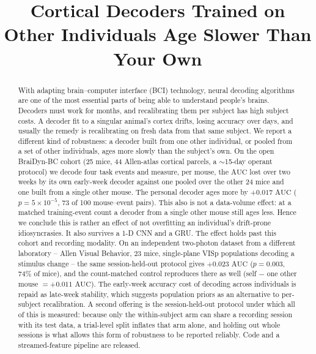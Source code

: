\documentclass[mlmain,onecolumn]{jmlr}
\title[Cortical Decoders Age Slower]{Cortical Decoders Trained on Other
Individuals Age Slower Than Your Own}
\author{\Name{Anonymous Author(s)}}
\newcommand{\auc}{\mathrm{AUC}}
\begin{document}
\maketitle

\begin{abstract}
With adapting brain--computer interface (BCI) technology, neural decoding algorithms are one of the
most essential parts of being able to understand people's brains. Decoders must work for months, and
recalibrating them per subject has high subject costs. A decoder fit to a singular animal's cortex
drifts, losing accuracy over days, and usually the remedy is recalibrating on fresh data from that
same subject. We report a different kind of robustness: a
decoder built from one other individual, or pooled from a set of other individuals, ages more slowly
than the subject's own. On the open BraiDyn-BC cohort (25 mice, 44 Allen-atlas cortical parcels, a
$\sim$15-day operant protocol) we decode four task events and measure, per mouse, the $\auc$ lost
over two weeks by its own early-week decoder against one pooled over the other 24 mice and one built
from a single other mouse. The personal decoder ages more by $+0.017$ $\auc$
($p = 5 \times 10^{-5}$, 73 of 100 mouse--event pairs). This also is not a data-volume effect: at a matched training-event count a
decoder from a single other mouse still ages less. Hence we conclude this is rather an effect of not
overfitting an individual's drift-prone idiosyncrasies. It also survives a 1-D CNN and a GRU. The
effect holds past this cohort and recording modality. On an independent two-photon dataset from a
different laboratory -- Allen Visual Behavior, 23 mice, single-plane VISp populations decoding a
stimulus change -- the same session-held-out protocol gives $+0.023$ $\auc$
($p = 0.003$, 74\% of mice), and the count-matched control reproduces there as well
(self $-$ one other mouse $= +0.011$ $\auc$). The
early-week accuracy cost of decoding across individuals is repaid as late-week stability, which
suggests population priors as an alternative to per-subject recalibration. A second offering is the
session-held-out protocol under which all of this is measured: because only the within-subject arm
can share a recording session with its test data, a trial-level split inflates that arm alone, and
holding out whole sessions is what allows this form of robustness to be reported reliably. Code and
a streamed-feature pipeline are released.
\end{abstract}
\end{document}
